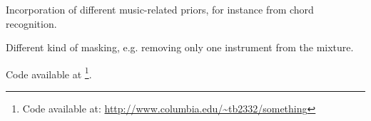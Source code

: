 \documentclass{article}
\begin{document}
Incorporation of different music-related priors, for instance from chord recognition.

Different kind of masking, e.g. removing only one instrument from the mixture.

Code available at \footnote{Code available at: \url{http://www.columbia.edu/~tb2332/something}}.





\end{document}
